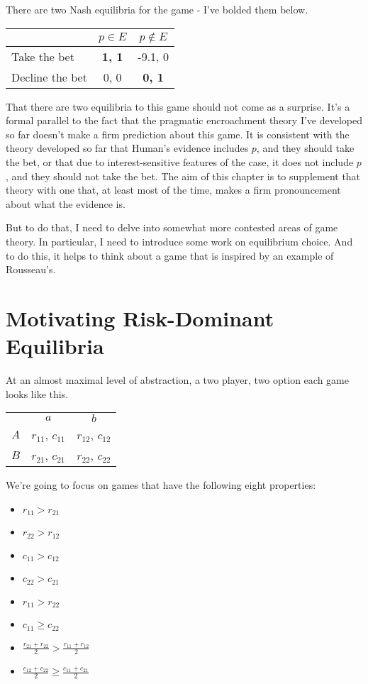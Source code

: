\documentclass[11pt,]{book}
\providecommand{\tightlist}{%
  \setlength{\itemsep}{0pt}\setlength{\parskip}{0pt}}
\def\toprule{}
\def\bottomrule{}
\def\midrule{}
\begin{document}
There are two Nash equilibria for the game - I've bolded them below.

\begin{longtable}[]{@{}lcc@{}}
\toprule
& \(p \in E\) & \(p \notin E\)\tabularnewline
\midrule
\endhead
Take the bet & \textbf{1, 1} & -9.1, 0\tabularnewline
Decline the bet & 0, 0 & \textbf{0, 1}\tabularnewline
\bottomrule
\end{longtable}

That there are two equilibria to this game should not come as a surprise. It's a formal parallel to the fact that the pragmatic encroachment theory I've developed so far doesn't make a firm prediction about this game. It is consistent with the theory developed so far that Human's evidence includes \(p\), and they should take the bet, or that due to interest-sensitive features of the case, it does not include \(p\), and they should not take the bet. The aim of this chapter is to supplement that theory with one that, at least most of the time, makes a firm pronouncement about what the evidence is.

But to do that, I need to delve into somewhat more contested areas of game theory. In particular, I need to introduce some work on equilibrium choice. And to do this, it helps to think about a game that is inspired by an example of Rousseau's.

\hypertarget{globalgame}{%
\section{Motivating Risk-Dominant Equilibria}\label{globalgame}}

At an almost maximal level of abstraction, a two player, two option each game looks like this.

\begin{longtable}[]{@{}lcc@{}}
\toprule
\endhead
& \(a\) & \(b\)\tabularnewline
\(A\) & \(r_{11}\), \(c_{11}\) & \(r_{12}\), \(c_{12}\)\tabularnewline
\(B\) & \(r_{21}\), \(c_{21}\) & \(r_{22}\), \(c_{22}\)\tabularnewline
\bottomrule
\end{longtable}

We're going to focus on games that have the following eight properties:

\begin{itemize}
\tightlist
\item
  \(r_{11} > r_{21}\)
\item
  \(r_{22} > r_{12}\)
\item
  \(c_{11} > c_{12}\)
\item
  \(c_{22} > c_{21}\)
\item
  \(r_{11} > r_{22}\)
\item
  \(c_{11} \geq c_{22}\)
\item
  \(\frac{r_{21}+r_{22}}{2} > \frac{r_{11}+r_{12}}{2}\)
\item
  \(\frac{c_{12}+c_{22}}{2} \geq \frac{c_{11}+c_{21}}{2}\)
\end{itemize}
\end{document}
